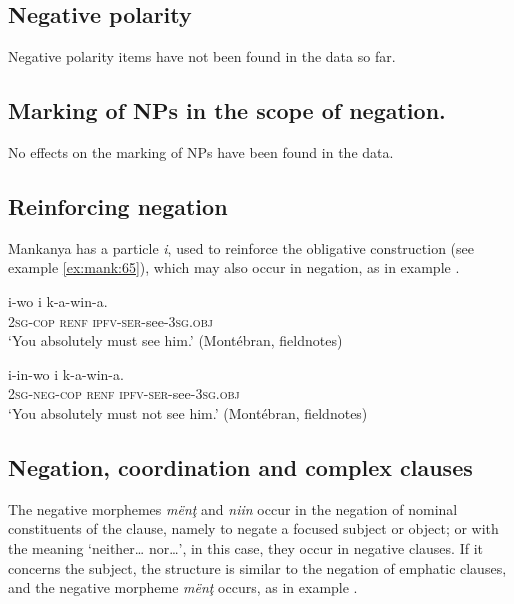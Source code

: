 \documentclass[output=paper,colorlinks,citecolor=brown]{langscibook}
\begin{document}
\subsection{Negative polarity}\label{sec:mank:4.2}

Negative polarity items have not been found in the data so far. 


\subsection{Marking of NPs in the scope of negation.}\label{sec:mank:4.3}

No effects on the marking of NPs have been found in the data.


\subsection{Reinforcing negation}\label{sec:mank:4.4}

Mankanya has a particle \textit{i}, used to reinforce the obligative construction (see example \ref{ex:mank:65}), which may also occur in negation, as in example .


\ea\label{ex:mank:65}
    \gll i-wo i k-a-win-a.\\
         \textsc{2sg-cop} \textsc{renf} \textsc{ipfv-ser}-see-\textsc{3sg.obj}\\
    \glt ‘You absolutely must see him.’ (Montébran, fieldnotes)
\z

\ea\label{ex:mank:66}
    \gll i-in-wo i k-a-win-a. \\
         \textsc{2sg-neg-cop} \textsc{renf} \textsc{ipfv-ser}-see-\textsc{3sg.obj}\\
    \glt ‘You absolutely must not see him.’ (Montébran, fieldnotes)
\z

\subsection{Negation, coordination and complex clauses}\label{sec:mank:4.5}

The negative morphemes \textit{mënţ} and \textit{niin} occur in the negation of nominal constituents of the clause, namely to negate a focused subject or object; or with the meaning ‘{neither}… {nor}…’, in this case, they occur in negative clauses. If it concerns the subject, the structure is similar to the negation of emphatic clauses, and the negative morpheme \textit{mënţ} occurs, as in example .
\end{document}
